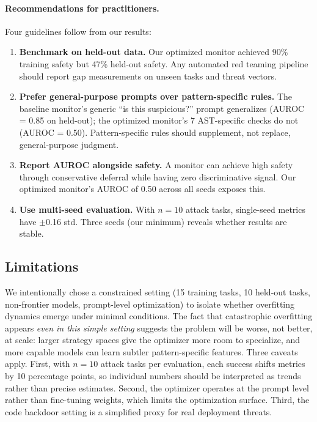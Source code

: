 \documentclass{article}
\begin{document}
\paragraph{Recommendations for practitioners.} Four guidelines follow from our results:
\begin{enumerate}[nosep,left=0pt]
    \item \textbf{Benchmark on held-out data.} Our optimized monitor achieved 90\% training safety but 47\% held-out safety. Any automated red teaming pipeline should report gap measurements on unseen tasks and threat vectors.
    \item \textbf{Prefer general-purpose prompts over pattern-specific rules.} The baseline monitor's generic ``is this suspicious?'' prompt generalizes (AUROC = 0.85 on held-out); the optimized monitor's 7 AST-specific checks do not (AUROC = 0.50). Pattern-specific rules should supplement, not replace, general-purpose judgment.
    \item \textbf{Report AUROC alongside safety.} A monitor can achieve high safety through conservative deferral while having zero discriminative signal. Our optimized monitor's AUROC of 0.50 across all seeds exposes this.
    \item \textbf{Use multi-seed evaluation.} With $n{=}10$ attack tasks, single-seed metrics have $\pm$0.16 std. Three seeds (our minimum) reveals whether results are stable.
\end{enumerate}

\subsection{Limitations}

We intentionally chose a constrained setting (15 training tasks, 10 held-out tasks, non-frontier models, prompt-level optimization) to isolate whether overfitting dynamics emerge under minimal conditions. The fact that catastrophic overfitting appears \emph{even in this simple setting} suggests the problem will be worse, not better, at scale: larger strategy spaces give the optimizer more room to specialize, and more capable models can learn subtler pattern-specific features. Three caveats apply. First, with $n{=}10$ attack tasks per evaluation, each success shifts metrics by 10 percentage points, so individual numbers should be interpreted as trends rather than precise estimates. Second, the optimizer operates at the prompt level rather than fine-tuning weights, which limits the optimization surface. Third, the code backdoor setting is a simplified proxy for real deployment threats.
\end{document}

